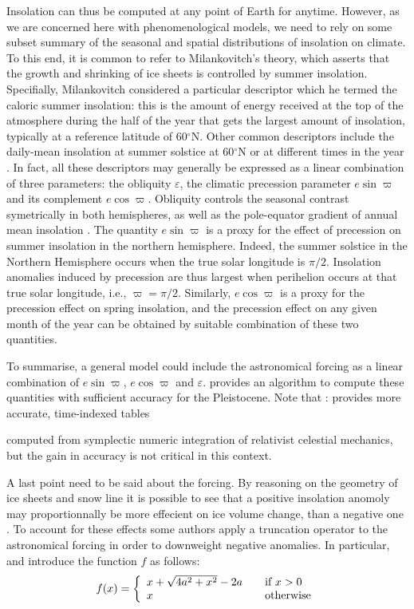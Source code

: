 \documentclass[a4paper,12pt]{article}
\newcommand{\degree}{\ensuremath{{}^\circ}}
\begin{document}
Insolation can thus be computed at any point of Earth for anytime. 
However, as we are concerned here with phenomenological models, we need to rely 
on some subset summary of the seasonal and spatial distributions of insolation on climate.
To this end, it is common to refer to  Milankovitch's theory, which asserts that the growth and shrinking of ice sheets is controlled by summer insolation.
Specifially, Milankovitch considered a particular descriptor which he termed the caloric summer insolation: this is
the amount of energy received at the top of the atmosphere during the half of the year that gets the largest amount of insolation, typically
at a reference latitude of 60\degree N. Other common descriptors include the daily-mean insolation at summer solstice at 60$\degree$N \cite{imbrie80}
or at different times in the year \cite{Saltzman1990}. In fact, all these descriptors may generally be expressed as a linear combination of three parameters: 
the obliquity $\varepsilon$, the climatic precession parameter $e\sin\varpi$ and its complement  $e\cos\varpi$.
Obliquity  controls the seasonal contrast symetrically
in both hemispheres, as well as the pole-equator gradient of annual mean insolation \cite{Loutre04}. 
The quantity $e\sin\varpi$ is a proxy for the effect of precession on summer insolation in the northern hemisphere. Indeed, 
the summer solstice in the Northern Hemisphere occurs when the true solar longitude is $\pi/2$. Insolation anomalies induced by   precession
are thus largest when perihelion occurs at that true solar longitude,  i.e., $\varpi = \pi/2$. Similarly, $e\cos\varpi$ is a proxy
for the precession effect on spring insolation, and the precession effect on any given month of the year can be obtained by suitable combination
of these two quantities. 

To summarise, a general model could include the astronomical forcing as a linear combination of $e\sin\varpi$, $e\cos\varpi$ and $\varepsilon$. 
\cite{Berger1978a} provides an algorithm to compute these quantities with sufficient accuracy for the Pleistocene. Note that :\cite{Laskar04aa} provides more accurate, time-indexed tables

computed from symplectic numeric integration of relativist celestial mechanics, but the gain in accuracy is not critical in this context. 

A last point need to be said about the forcing. By reasoning on the geometry of ice sheets and snow line it is possible to see that a positive insolation anomoly may proportionnally be more effecient 
on ice volume change, than a negative one \cite{oerlemansXX, Ruddiman06aa}. To account for these effects 
some authors apply a truncation operator to the astronomical forcing in order to downweight
negative anomalies. In particular, \cite{paillard98} and \cite{Parrenin2012} introduce the function $f$ as follows:
\[ f(x) = \left\{
  \begin{array}{l l}
    x + \sqrt{4a^2 + x^2} - 2a & \quad \text{if $x > 0$}\\
    x & \quad \text{otherwise}
  \end{array} \right.
\]
 
\end{document}
